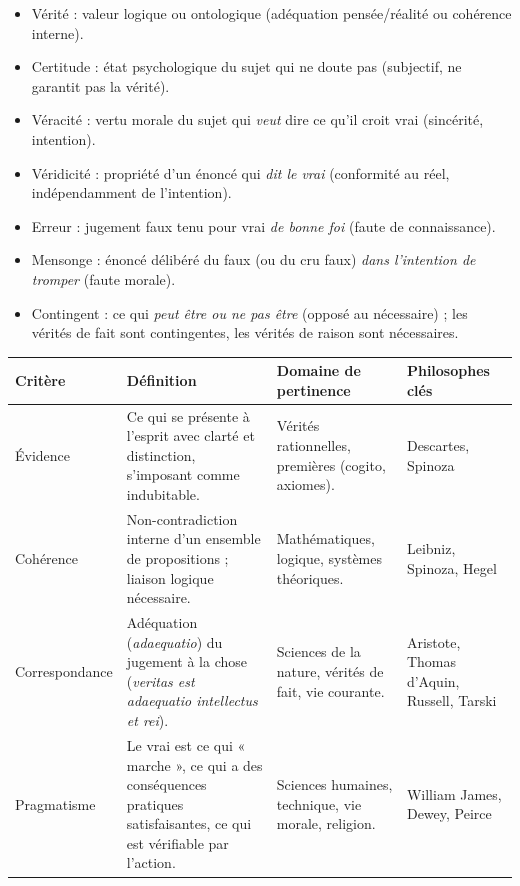 \documentclass[11pt]{article}
\newcommand{\cle}[1]{{\popxbold\color{popdark}#1}}
\begin{document}
\begin{definition}
\begin{itemize}
\item \cle{Vérité} : valeur logique ou ontologique (adéquation pensée/réalité ou cohérence interne).
\item \cle{Certitude} : état psychologique du sujet qui ne doute pas (subjectif, ne garantit pas la vérité).
\item \cle{Véracité} : vertu morale du sujet qui \emph{veut} dire ce qu'il croit vrai (sincérité, intention).
\item \cle{Véridicité} : propriété d'un énoncé qui \emph{dit le vrai} (conformité au réel, indépendamment de l'intention).
\item \cle{Erreur} : jugement faux tenu pour vrai \emph{de bonne foi} (faute de connaissance).
\item \cle{Mensonge} : énoncé délibéré du faux (ou du cru faux) \emph{dans l'intention de tromper} (faute morale).
\item \cle{Contingent} : ce qui \emph{peut être ou ne pas être} (opposé au nécessaire) ; les vérités de fait sont contingentes, les vérités de raison sont nécessaires.
\end{itemize}
\end{definition}

\begin{propriete}
\begin{center}
\begin{tabularx}{\linewidth}{|l|X|X|l|}
\hline
\rowcolor{popblueL}
\textbf{Critère} & \textbf{Définition} & \textbf{Domaine de pertinence} & \textbf{Philosophes clés} \\
\hline
\cle{Évidence} & Ce qui se présente à l'esprit avec clarté et distinction, s'imposant comme indubitable. & Vérités rationnelles, premières (cogito, axiomes). & Descartes, Spinoza \\
\hline
\cle{Cohérence} & Non-contradiction interne d'un ensemble de propositions ; liaison logique nécessaire. & Mathématiques, logique, systèmes théoriques. & Leibniz, Spinoza, Hegel \\
\hline
\cle{Correspondance} & Adéquation (\emph{adaequatio}) du jugement à la chose (\emph{veritas est adaequatio intellectus et rei}). & Sciences de la nature, vérités de fait, vie courante. & Aristote, Thomas d'Aquin, Russell, Tarski \\
\hline
\cle{Pragmatisme} & Le vrai est ce qui « marche », ce qui a des conséquences pratiques satisfaisantes, ce qui est vérifiable par l'action. & Sciences humaines, technique, vie morale, religion. & William James, Dewey, Peirce \\
\hline
\end{tabularx}
\end{center}
\end{propriete}
\end{document}
